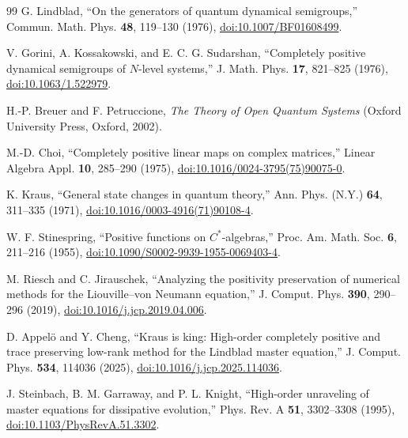 \begin{thebibliography}{99}
G. Lindblad, ``On the generators of quantum dynamical semigroups,'' Commun. Math. Phys. \textbf{48}, 119--130 (1976), \href{https://doi.org/10.1007/BF01608499}{doi:10.1007/BF01608499}.

V. Gorini, A. Kossakowski, and E. C. G. Sudarshan, ``Completely positive dynamical semigroups of $N$-level systems,'' J. Math. Phys. \textbf{17}, 821--825 (1976), \href{https://doi.org/10.1063/1.522979}{doi:10.1063/1.522979}.

H.-P. Breuer and F. Petruccione, \textit{The Theory of Open Quantum Systems} (Oxford University Press, Oxford, 2002).

M.-D. Choi, ``Completely positive linear maps on complex matrices,'' Linear Algebra Appl. \textbf{10}, 285--290 (1975), \href{https://doi.org/10.1016/0024-3795(75)90075-0}{doi:10.1016/0024-3795(75)90075-0}.

K. Kraus, ``General state changes in quantum theory,'' Ann. Phys. (N.Y.) \textbf{64}, 311--335 (1971), \href{https://doi.org/10.1016/0003-4916(71)90108-4}{doi:10.1016/0003-4916(71)90108-4}.

W. F. Stinespring, ``Positive functions on $C^*$-algebras,'' Proc. Am. Math. Soc. \textbf{6}, 211--216 (1955), \href{https://doi.org/10.1090/S0002-9939-1955-0069403-4}{doi:10.1090/S0002-9939-1955-0069403-4}.

M. Riesch and C. Jirauschek, ``Analyzing the positivity preservation of numerical methods for the Liouville--von Neumann equation,'' J. Comput. Phys. \textbf{390}, 290--296 (2019), \href{https://doi.org/10.1016/j.jcp.2019.04.006}{doi:10.1016/j.jcp.2019.04.006}.

D. Appel\"o and Y. Cheng, ``Kraus is king: High-order completely positive and trace preserving low-rank method for the Lindblad master equation,'' J. Comput. Phys. \textbf{534}, 114036 (2025), \href{https://doi.org/10.1016/j.jcp.2025.114036}{doi:10.1016/j.jcp.2025.114036}.

J. Steinbach, B. M. Garraway, and P. L. Knight, ``High-order unraveling of master equations for dissipative evolution,'' Phys. Rev. A \textbf{51}, 3302--3308 (1995), \href{https://doi.org/10.1103/PhysRevA.51.3302}{doi:10.1103/PhysRevA.51.3302}.


\end{thebibliography}
